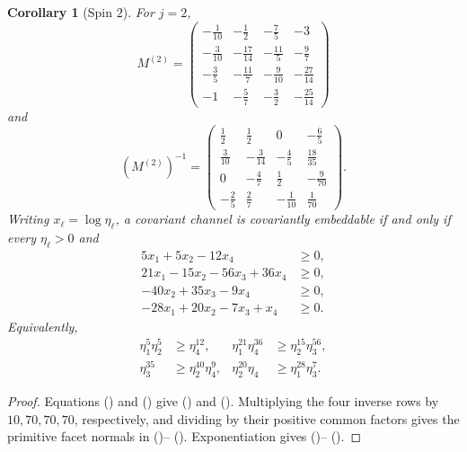 \documentclass[twoside,10pt]{article}
\numberwithin{equation}{section}
\theoremstyle{slbody}
\newtheorem{corollary}[theorem]{Corollary}
\theoremstyle{definition}
\theoremstyle{remark}
\renewcommand{\eqref}[1]{%
  \textup{{\normalfont(\oldstylenums{\ref{#1}}}\normalfont)}}
\begin{document}
\begin{corollary}[Spin \(2\)]\label{cor:spin-two}
For \(j=2\),
\begin{equation}\label{eq:M-spin-two}
 M^{(2)}=
 \begin{pmatrix}
 -\tfrac1{10}&-\tfrac12&-\tfrac75&-3\\
 -\tfrac3{10}&-\tfrac{17}{14}&-\tfrac{11}5&-\tfrac97\\
 -\tfrac35&-\tfrac{11}7&-\tfrac9{10}&-\tfrac{27}{14}\\
 -1&-\tfrac57&-\tfrac32&-\tfrac{25}{14}
 \end{pmatrix}
\end{equation}
and
\begin{equation}\label{eq:Minv-spin-two}
 (M^{(2)})^{-1}=
 \begin{pmatrix}
 \tfrac12&\tfrac12&0&-\tfrac65\\
 \tfrac3{10}&-\tfrac3{14}&-\tfrac45&\tfrac{18}{35}\\
 0&-\tfrac47&\tfrac12&-\tfrac9{70}\\
 -\tfrac25&\tfrac27&-\tfrac1{10}&\tfrac1{70}
 \end{pmatrix}.
\end{equation}
Writing \(x_\ell=\log\eta_\ell\), a covariant channel is
covariantly embeddable if and only if every \(\eta_\ell>0\) and
\begin{align}
 5x_1+5x_2-12x_4&\geq0,                                    \label{eq:spin-two-facet-one}\\
 21x_1-15x_2-56x_3+36x_4&\geq0,                            \label{eq:spin-two-facet-two}\\
 -40x_2+35x_3-9x_4&\geq0,                                  \label{eq:spin-two-facet-three}\\
 -28x_1+20x_2-7x_3+x_4&\geq0.                              \label{eq:spin-two-facet-four}
\end{align}
Equivalently,
\begin{align}
 \eta_1^5\eta_2^5&\geq\eta_4^{12},
 &\eta_1^{21}\eta_4^{36}&\geq\eta_2^{15}\eta_3^{56},       \label{eq:spin-two-multiplicative-one}\\
 \eta_3^{35}&\geq\eta_2^{40}\eta_4^9,
 &\eta_2^{20}\eta_4&\geq\eta_1^{28}\eta_3^7.              \label{eq:spin-two-multiplicative-two}
\end{align}
\end{corollary}

\begin{proof}
Equations \eqref{eq:M-definition} and \eqref{eq:M-inverse-formula}
give \eqref{eq:M-spin-two} and \eqref{eq:Minv-spin-two}.  Multiplying
the four inverse rows by \(10,70,70,70\), respectively, and dividing
by their positive common factors gives the primitive facet normals
in \eqref{eq:spin-two-facet-one}--\eqref{eq:spin-two-facet-four}.
Exponentiation gives
\eqref{eq:spin-two-multiplicative-one}--
\eqref{eq:spin-two-multiplicative-two}.
\end{proof}
\end{document}
